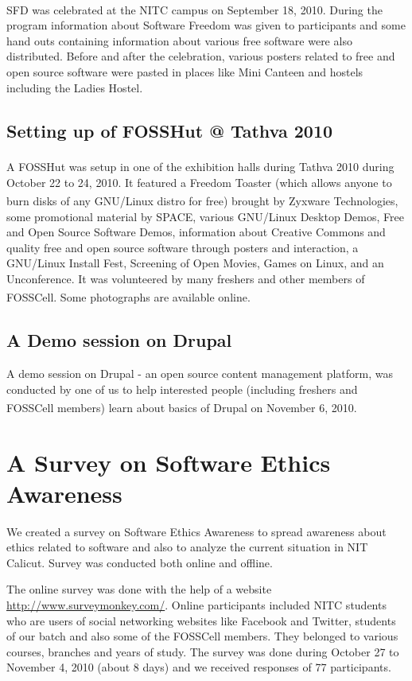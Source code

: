 SFD was celebrated at the NITC campus on September 18, 2010\textsuperscript{\cite{sfd}}. During the program information about Software Freedom was given to participants and some hand outs containing information about various free software were also distributed. Before and after the celebration, various posters related to free and open source software were pasted in places like Mini Canteen and hostels including the Ladies Hostel.

\subsection{Setting up of FOSSHut @ Tathva 2010}
A FOSSHut was setup in one of the exhibition halls during Tathva 2010\textsuperscript{\cite{tathva}} during October 22 to 24, 2010. It featured a Freedom Toaster (which allows anyone to burn disks of any GNU/Linux distro for free) brought by Zyxware Technologies\textsuperscript{\cite{zyxware}}, some promotional material by SPACE, various GNU/Linux Desktop Demos, Free and Open Source Software Demos, information about Creative Commons and quality free and open source software through posters and interaction, a GNU/Linux Install Fest, Screening of Open Movies, Games on Linux, and an Unconference. It was volunteered by many freshers and other members of FOSSCell. Some photographs are available online\textsuperscript{\cite{fosshutpics}}.

\subsection{A Demo session on Drupal}
A demo session on Drupal - an open source content management platform, was conducted by one of us to help interested people (including freshers and FOSSCell members) learn about basics of Drupal on November 6, 2010\textsuperscript{\cite{drupaldemo}}.

\section{A Survey on Software Ethics Awareness}
We created a survey on Software Ethics Awareness to spread awareness about ethics related to software and also to analyze the current situation in NIT Calicut. Survey was conducted both online and offline.

The online survey was done with the help of a website \url{http://www.surveymonkey.com/}. Online participants included NITC students who are users of social networking websites like Facebook and Twitter, students of our batch and also some of the FOSSCell members. They belonged to various courses, branches and years of study. The survey was done during October 27 to November 4, 2010 (about 8 days) and we received responses of 77 participants.

